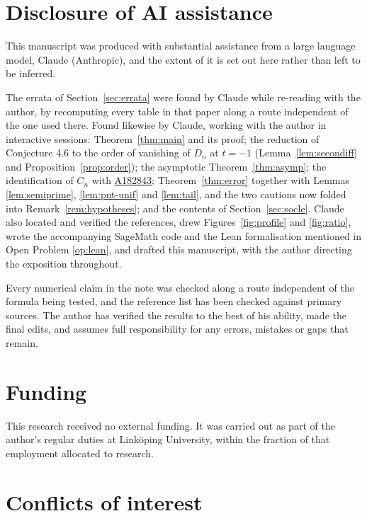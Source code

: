 \documentclass[a4paper,11pt,oneside,reqno]{amsart}
\theoremstyle{definition}
\theoremstyle{remark}
\theoremstyle{plain}
\newcommand{\seqnum}[1]{\href{https://oeis.org/#1}{\underline{#1}}}
\begin{document}
\section*{Disclosure of AI assistance}

This manuscript was produced with substantial assistance from a large language
model, Claude (Anthropic), and the extent of it is set out here rather than
left to be inferred.

The errata of Section~\ref{sec:errata} were found by Claude while re-reading
\cite{Snellman2000} with the author, by recomputing every table in that paper
along a route independent of the one used there. Found likewise by Claude,
working with the author in interactive sessions: Theorem~\ref{thm:main} and its
proof; the reduction of Conjecture 4.6 to the order of vanishing of \(D_n\) at
\(t = -1\) (Lemma~\ref{lem:secondiff} and Proposition~\ref{prop:order}); the
asymptotic Theorem~\ref{thm:asymp}; the identification of \(C_n\) with
\seqnum{A182843}; Theorem~\ref{thm:error} together with Lemmas
\ref{lem:semiprime}, \ref{lem:pnt-unif} and \ref{lem:tail}, and the two
cautions now folded into Remark~\ref{rem:hypotheses}; and
the contents of Section~\ref{sec:socle}. Claude also located and verified the
references, drew Figures~\ref{fig:profile} and \ref{fig:ratio}, wrote the accompanying
\textsf{SageMath} code and the Lean formalisation mentioned in Open Problem
\ref{op:lean}, and drafted this manuscript, with the author directing the
exposition throughout.

Every numerical claim in the note was checked along a route independent of the
formula being tested, and the reference list has been checked against primary
sources. The author has verified the results to the best of his ability, made
the final edits, and assumes full responsibility for any errors, mistakes or
gaps that remain.

\section*{Funding}

This research received no external funding. It was carried out as part of the
author's regular duties at Linköping University, within the fraction of that
employment allocated to research.

\section*{Conflicts of interest}
\end{document}
